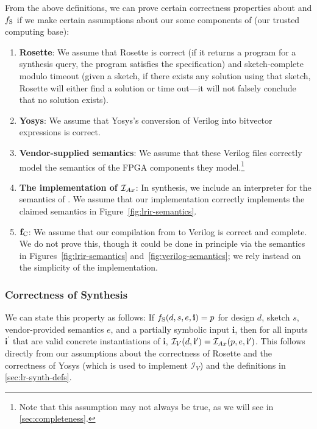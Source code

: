 From the above definitions,
  we can prove certain correctness properties
  about \lrfn{} and $f_{\text{S}{}}$
  if we make certain assumptions about our some components of \lr (our trusted computing base):
\begin{enumerate}
\item \textbf{Rosette}: We assume that Rosette is correct (if it returns a program for a synthesis query, the program satisfies the specification) and sketch-complete modulo timeout (given a sketch, if there exists any solution using that sketch, Rosette will either find a solution or time out---it will not falsely conclude that no solution exists).
\item \textbf{Yosys}: We assume that Yosys's conversion of Verilog into bitvector expressions is correct.
\item \textbf{Vendor-supplied semantics}: We assume that these Verilog files correctly model the semantics of the FPGA components they model.\footnote{
  Note that this assumption may not always be true,
    as we will see in
    \cref{sec:completeness}.
}
\item \textbf{The implementation of $\mathcal{I}_{Ax}$}: In synthesis, we include an interpreter for the semantics of \lrir. We assume that our implementation correctly implements the claimed semantics in Figure~\ref{fig:lrir-semantics}.
\item $\mathbf{f_{\text{C}{}}}$: We assume that our compilation from \lrir to Verilog is correct and complete. We do not prove this, though it could be done in principle via the semantics in Figures~\ref{fig:lrir-semantics} and~\ref{fig:verilog-semantics}; we rely instead on the simplicity of the implementation.
\end{enumerate}

\subsubsection{Correctness of Synthesis}

We can state this property as follows: 
If $f_{\text{S}{}}(d, s, e, \mathbf{i}) = p$
  for design $d$, 
  sketch $s$,
  vendor-provided semantics $e$,
  and a partially symbolic input $\mathbf{i}$, 
  then for all inputs $\mathbf{i}^\prime$ 
  that are valid concrete instantiations of $\mathbf{i}$,
  $\mathcal{I}_V(d, \mathbf{i}^\prime) = \mathcal{I}_{Ax}(p, e, \mathbf{i}^\prime)$.
This follows directly from our assumptions about the correctness of Rosette and the correctness of Yosys (which is used to implement $\mathcal{I}_V$) and the definitions in \cref{sec:lr-synth-defs}.

